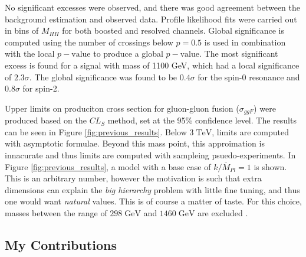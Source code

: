 \documentclass[12pt]{article}
\newcommand{\un}[1]{\;\text{#1}}
\begin{document}
No significant excesses were observed, and there was good agreement between the
background estimation and observed data. Profile likelihood fits were carried
out in bins of $M_{HH}$ for both boosted and resolved channels. Global
significance is computed using the number of crossings below $p=0.5$ is used in
combination with the local $p-\text{value}$ to produce a global
$p-\text{value}$. The most significant excess is found for a signal with mass of
1100 GeV, which had a local significance of $2.3\sigma$. The global significance
was found to be $0.4\sigma$ for the spin-0 resonance and $0.8\sigma$ for spin-2.

Upper limits on produciton cross section for gluon-gluon fusion ($\sigma_{ggF}$)
were produced based on the $CL_S$ method, set at the 95\% confidence level. The
results can be seen in Figure \ref{fig:previous_results}. Below $3\un{TeV}$,
limits are computed with asymptotic formulae. Beyond this mass point, this
approimation is innacurate and thus limits are computed with sampleing
psuedo-experiments. In Figure \ref{fig:previous_results}, a model with a base
case of $k/\overline{M}_{Pl}=1$ is shown. This is an arbitrary number, however
the motivation is such that extra dimensions can explain the \textit{big
hierarchy} problem with little fine tuning, and thus one would want
\textit{natural} values. This is of course a matter of taste. For this choice,
masses between the range of $298\;\text{GeV}$ and $1460\;\text{GeV}$ are
excluded \cite{hh4b_resonant}. 

\subsection{My Contributions}
\end{document}
